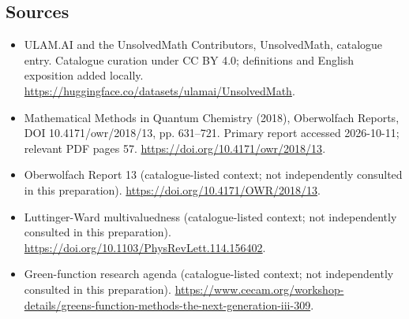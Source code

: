 \documentclass[11pt]{article}
\begin{document}
\subsection{Sources}
\begin{itemize}
\item[\hypertarget{source:statement:1}{S1}] ULAM.AI and the UnsolvedMath Contributors, UnsolvedMath, catalogue entry. Catalogue curation under CC BY 4.0; definitions and English exposition added locally.
\url{https://huggingface.co/datasets/ulamai/UnsolvedMath}.
\item[\hypertarget{source:statement:2}{S2}] Mathematical Methods in Quantum Chemistry (2018), Oberwolfach Reports, DOI 10.4171/owr/2018/13, pp. 631--721. Primary report accessed 2026-10-11; relevant PDF pages 57.
\url{https://doi.org/10.4171/owr/2018/13}.
\item[\hypertarget{source:statement:3}{S3}] Oberwolfach Report 13 (catalogue-listed context; not independently consulted in this preparation).
\url{https://doi.org/10.4171/OWR/2018/13}.
\item[\hypertarget{source:statement:4}{S4}] Luttinger-Ward multivaluedness (catalogue-listed context; not independently consulted in this preparation).
\url{https://doi.org/10.1103/PhysRevLett.114.156402}.
\item[\hypertarget{source:statement:5}{S5}] Green-function research agenda (catalogue-listed context; not independently consulted in this preparation).
\url{https://www.cecam.org/workshop-details/greens-function-methods-the-next-generation-iii-309}.
\end{itemize}
\label{end:statement}
\end{document}
